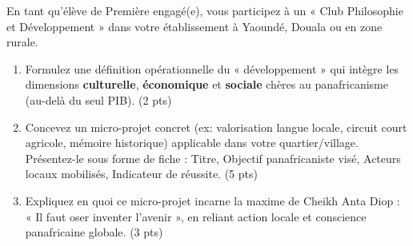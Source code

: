 \documentclass[11pt]{article}
\begin{document}
\begin{exercice}
En tant qu'élève de Première engagé(e), vous participez à un « Club Philosophie et Développement » dans votre établissement à Yaoundé, Douala ou en zone rurale.
\begin{enumerate}
    \item Formulez une définition opérationnelle du « développement » qui intègre les dimensions \textbf{culturelle}, \textbf{économique} et \textbf{sociale} chères au panafricanisme (au-delà du seul PIB). (2 pts)
    \item Concevez un micro-projet concret (ex: valorisation langue locale, circuit court agricole, mémoire historique) applicable dans votre quartier/village. Présentez-le sous forme de fiche : Titre, Objectif panafricaniste visé, Acteurs locaux mobilisés, Indicateur de réussite. (5 pts)
    \item Expliquez en quoi ce micro-projet incarne la maxime de Cheikh Anta Diop : « Il faut oser inventer l'avenir », en reliant action locale et conscience panafricaine globale. (3 pts)
\end{enumerate}
\end{exercice}
\end{document}
